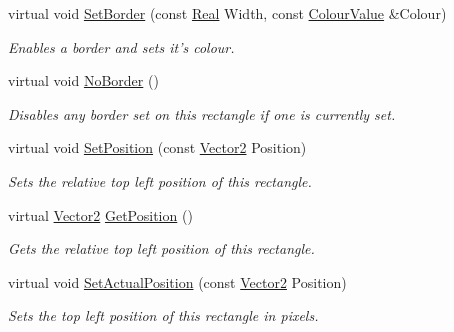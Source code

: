 \begin{DoxyCompactItemize}
virtual void \hyperlink{classphys_1_1UI_1_1Rectangle_acb2598198ee72dd97becd6601c5c517d}{SetBorder} (const \hyperlink{namespacephys_af7eb897198d265b8e868f45240230d5f}{Real} Width, const \hyperlink{classphys_1_1ColourValue}{ColourValue} \&Colour)
\begin{DoxyCompactList}\small\item\em Enables a border and sets it's colour. \item\end{DoxyCompactList}\item 
\hypertarget{classphys_1_1UI_1_1Rectangle_aebeea2052a72be49eb9dece731022c78}{
virtual void \hyperlink{classphys_1_1UI_1_1Rectangle_aebeea2052a72be49eb9dece731022c78}{NoBorder} ()}
\label{d1/d5d/classphys_1_1UI_1_1Rectangle_aebeea2052a72be49eb9dece731022c78}

\begin{DoxyCompactList}\small\item\em Disables any border set on this rectangle if one is currently set. \item\end{DoxyCompactList}\item 
virtual void \hyperlink{classphys_1_1UI_1_1Rectangle_a9dce5088e8886ab1a937f800f72dfc0d}{SetPosition} (const \hyperlink{classphys_1_1Vector2}{Vector2} Position)
\begin{DoxyCompactList}\small\item\em Sets the relative top left position of this rectangle. \item\end{DoxyCompactList}\item 
virtual \hyperlink{classphys_1_1Vector2}{Vector2} \hyperlink{classphys_1_1UI_1_1Rectangle_aa0e2d6170f0b2d5b1f915c705e7fca10}{GetPosition} ()
\begin{DoxyCompactList}\small\item\em Gets the relative top left position of this rectangle. \item\end{DoxyCompactList}\item 
virtual void \hyperlink{classphys_1_1UI_1_1Rectangle_ab1fceb63091f7001307c634ac56e184d}{SetActualPosition} (const \hyperlink{classphys_1_1Vector2}{Vector2} Position)
\begin{DoxyCompactList}\small\item\em Sets the top left position of this rectangle in pixels. \item\end{DoxyCompactList}\item 

\end{DoxyCompactItemize}
